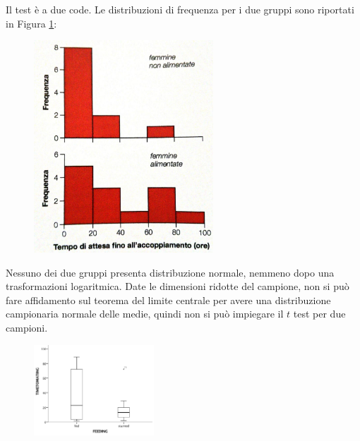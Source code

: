 \documentclass[10pt, draft]{book}
\newcounter{example}[section]
\begin{document}
\begin{example}
\begin{itemize}
    \end{itemize}
    Il test è a due code. Le distribuzioni di frequenza per i due gruppi sono riportati in Figura \ref{fig13.5-1}:
    \begin{figure}[H]
        \centering
        \includegraphics[width=0.6\textwidth]{fig13.5-1}
        \caption{\small{}}
        \label{fig13.5-1}
    \end{figure}
    Nessuno dei due gruppi presenta distribuzione normale, nemmeno dopo una trasformazioni logaritmica. Date le dimensioni ridotte del campione, non si può fare affidamento sul teorema del limite centrale per avere una distribuzione campionaria normale delle medie, quindi non si può impiegare il $t$ test per due campioni.\\
    \begin{figure}[H]
        \centering
        \includegraphics[width=0.4\textwidth]{grilli}
        \caption{\small{}}
        \label{grilli}
    \end{figure}


\end{example}
\end{document}
